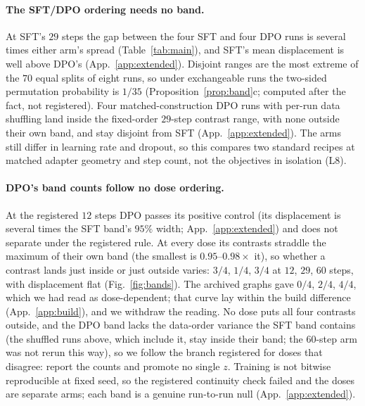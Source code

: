 \documentclass{article}
\begin{document}
\paragraph{The SFT/DPO ordering needs no band.} At SFT's $29$ steps the gap between the four SFT and four DPO runs is several times either arm's spread (Table~\ref{tab:main}), and SFT's mean displacement is well above DPO's (App.~\ref{app:extended}). Disjoint ranges are the most extreme of the $70$ equal splits of eight runs, so under exchangeable runs the two-sided permutation probability is $1/35$ (Proposition~\ref{prop:band}c; computed after the fact, not registered). Four matched-construction DPO runs with per-run data shuffling land inside the fixed-order $29$-step contrast range, with none outside their own band, and stay disjoint from SFT (App.~\ref{app:extended}). The arms still differ in learning rate and dropout, so this compares two standard recipes at matched adapter geometry and step count, not the objectives in isolation (L8).

\paragraph{DPO's band counts follow no dose ordering.} At the registered $12$ steps DPO passes its positive control (its displacement is several times the SFT band's $95\%$ width; App.~\ref{app:extended}) and does not separate under the registered rule. At every dose its contrasts straddle the maximum of their own band (the smallest is $0.95$--$0.98\times$ it), so whether a contrast lands just inside or just outside varies: $3/4$, $1/4$, $3/4$ at $12$, $29$, $60$ steps, with displacement flat (Fig.~\ref{fig:bands}). The archived graphs gave $0/4$, $2/4$, $4/4$, which we had read as dose-dependent; that curve lay within the build difference (App.~\ref{app:build}), and we withdraw the reading. No dose puts all four contrasts outside, and the DPO band lacks the data-order variance the SFT band contains (the shuffled runs above, which include it, stay inside their band; the $60$-step arm was not rerun this way), so we follow the branch registered for doses that disagree: report the counts and promote no single $z$. Training is not bitwise reproducible at fixed seed, so the registered continuity check failed and the doses are separate arms; each band is a genuine run-to-run null (App.~\ref{app:extended}).
\end{document}
